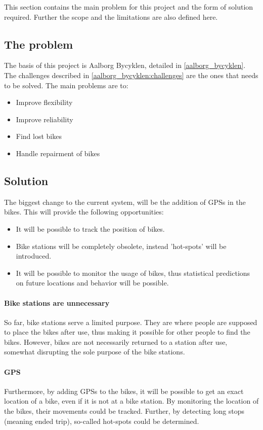 This section contains the main problem for this project and the form of solution required.
Further the scope and the limitations are also defined here.
\subsection{The problem}
The basis of this project is Aalborg Bycyklen, detailed in \cref{aalborg_bycyklen}.
The challenges described in \cref{aalborg_bycyklen:challenges} are the ones that needs to be solved.
The main problems are to:
\begin{itemize}
\item Improve flexibility
\item Improve reliability
\item Find lost bikes
\item Handle repairment of bikes
\end{itemize}

\subsection{Solution}
The biggest change to the current system, will be the addition of GPSs in the bikes.
This will provide the following opportunities:
\begin{itemize}
\item It will be possible to track the position of bikes.
\item Bike stations will be completely obsolete, instead 'hot-spots' will be introduced.
\item It will be possible to monitor the usage of bikes, thus statistical predictions on future locations and behavior will be possible.
\end{itemize}

\paragraph{Bike stations are unnecessary}
So far, bike stations serve a limited purpose.
They are where people are supposed to place the bikes after use, thus making it possible for other people to find the bikes.
However, bikes are not necessarily returned to a station after use, somewhat disrupting the sole purpose of the bike stations.

\paragraph{GPS}
Furthermore, by adding GPSs to the bikes, it will be possible to get an exact location of a bike, even if it is not at a bike station.
By monitoring the location of the bikes, their movements could be tracked.
Further, by detecting long stops (meaning ended trip), so-called hot-spots could be determined.

